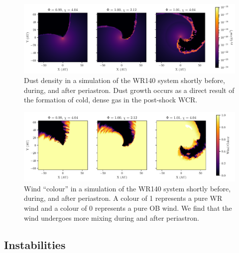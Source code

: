 \begin{figure}
  \centering
  \includegraphics[width=\linewidth]{assets/periastron-3-rhod.pdf}
  \caption[Dust density in a simulation of the WR140 system]{Dust density in a simulation of the WR140 system shortly before, during, and after periastron. Dust growth occurs as a direct result of the formation of cold, dense gas in the post-shock WCR.}
  \label{fig:p2-fullpage-rhod}
\end{figure}

\begin{figure}
  \centering
  \includegraphics[width=\linewidth]{assets/periastron-3-r0.pdf}
  \caption[Wind ``colour'' in a simulation of the WR140 system]{Wind ``colour'' in a simulation of the WR140 system shortly before, during, and after periastron. A colour of 1 represents a pure WR wind and a colour of 0 represents a pure OB wind. We find that the wind undergoes more mixing during and after periastron.}
  \label{fig:p2-fullpage-r0}
\end{figure}

\subsection{Instabilities}
\label{sec:p2-instab}


